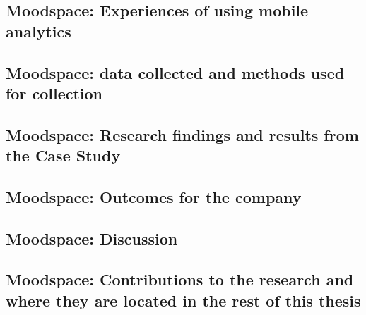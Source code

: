 \subsection{Moodspace: Experiences of using mobile analytics}

\subsection{Moodspace: data collected and methods used for collection}

\subsection{Moodspace: Research findings and results from the Case Study}

\subsection{Moodspace: Outcomes for the company}

\subsection{Moodspace: Discussion}

\subsection{Moodspace: Contributions to the research and where they are located in the rest of this thesis}
